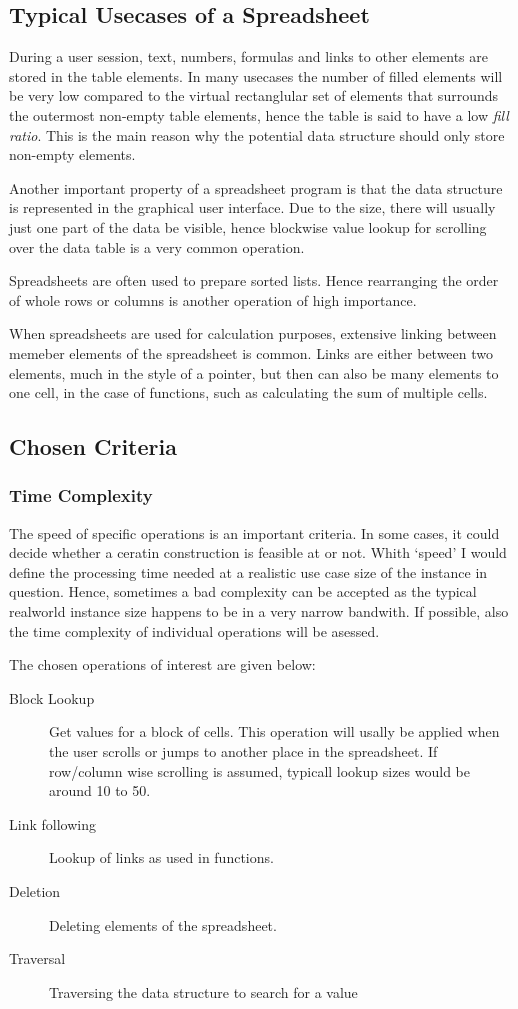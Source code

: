 \documentclass[a4paper,11pt,twoside]{article}
\begin{document}
\subsection{Typical Usecases of a Spreadsheet}
During a user session, text, numbers, formulas and links to
other elements are stored in the table elements. In many usecases the
number of filled elements will be very low compared to the virtual
rectanglular set of elements that surrounds the outermost non-empty
table elements, hence the table is said to have a low \emph{fill
 ratio}. This is the main reason why the potential data structure
should only store non-empty elements.

Another important property of a spreadsheet program is that the data
structure is represented in the graphical user interface. Due to the
size, there will usually just one part of the data be visible, hence
blockwise value lookup for scrolling over the data table is a very
common operation.

Spreadsheets are often used to prepare sorted lists. Hence
rearranging the order of whole rows or columns is another operation of
high importance.

When spreadsheets are used for calculation purposes, extensive linking
between memeber elements of the spreadsheet is common. Links are
either between two elements, much in the style of a pointer, but then
can also be many elements to one cell, in the case of functions, such
as calculating the sum of multiple cells.




\subsection{Chosen Criteria}
\subsubsection{Time Complexity}
The speed of specific operations is an important criteria. In some
cases, it could decide whether a ceratin construction is feasible at
or not. Whith `speed' I would define the processing time needed at a
realistic use case size of the instance in question. Hence, sometimes
a bad complexity can be accepted as the typical realworld instance
size happens to be in a very narrow bandwith.
If possible, also the time complexity of individual operations will be
asessed.    

The chosen operations of interest are given below:

\begin{description}
\item[Block Lookup] Get values for a block of cells. This operation
  will usally be applied when the user scrolls or jumps to another
  place in the spreadsheet. If row/column wise scrolling is assumed,
  typicall lookup sizes would be around 10 to 50. 
\item[Link following] Lookup of links as used in functions. 
\item[Deletion] Deleting elements of the spreadsheet.
\item[Traversal] Traversing the data structure to search for a value
\end{description}
\end{document}
